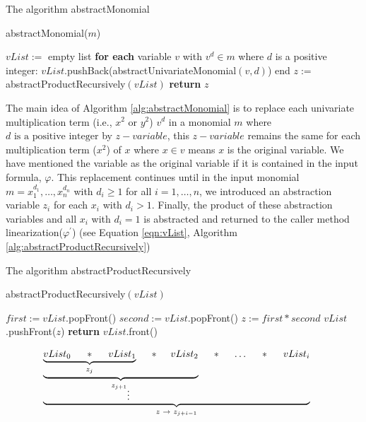 \begin{algorithm}
\caption{The algorithm abstractMonomial} 
\label{alg:abstractMonomial}
abstractMonomial($m$)
\begin{algorithmic}[1]
\State $vList :=$ empty list
\State \textbf{for each} variable $v$ with $v^d \in m$ where $d$ is a positive integer:
\State \hspace{5mm} $vList$.pushBack(abstractUnivariateMonomial$(v, d)$)
\State end
\State $z :=$ abstractProductRecursively$(vList)$
\State \textbf{return} $z$
\end{algorithmic}
\end{algorithm}

\noindent The main idea of Algorithm \ref{alg:abstractMonomial} is to replace each univariate multiplication term (i.e., $x^2$ or $y^2$) $v^d$ in a monomial $m$ where $d \text{ is a positive integer}$ by $z-variable$, this $z-variable$ remains the same for each multiplication term ($x^2$) of $x$ where $x \in v$ means $x$ is the original variable.
We have mentioned the variable as the original variable if it is contained in the input formula, $\varphi$.
This replacement continues until in the input monomial $m = x_{1}^{d_{1}}, \dots,x_{n}^{d_{n}}$ with $d_i \geq 1$ for all $i = 1, \dots, n$, we introduced an abstraction variable $z_i$ for each $x_i$ with $d_i > 1$.
Finally, the product of these abstraction variables and all $x_i$ with $d_i = 1$ is abstracted and returned to the caller method linearization($\varphi^\prime$) (see Equation \ref{eqn:vList}, Algorithm \ref{alg:abstractProductRecursively})\newline 

\begin{algorithm}
\caption{The algorithm abstractProductRecursively} 
\label{alg:abstractProductRecursively}
abstractProductRecursively$(vList)$
\begin{algorithmic}[1]
\State $first:= vList$.popFront() 
\State $second:= vList$.popFront()
\State $z:= first \ast second$
\State $vList$.pushFront($z$)
\EndWhile
\State \textbf{return} $vList$.front()
\end{algorithmic}
\end{algorithm}

\begin{align}
    \underbrace{ \underbrace{ \underbrace{ vList_{0} \hspace{5mm} \ast \hspace{5mm} vList_{1} }\limits_{z_{j}} \hspace{5mm} \ast \hspace{5mm} vList_{2} }\limits_{{z_{j+1}}_{\vdots}} \hspace{5mm} \ast \hspace{5mm} \dots \hspace{5mm} \ast \hspace{5mm} vList_{i}}\limits_{z \hspace{1mm} \to \hspace{1mm} z_{j+i-1}} \hspace{5mm} \label{eqn:vList}
\end{align}

